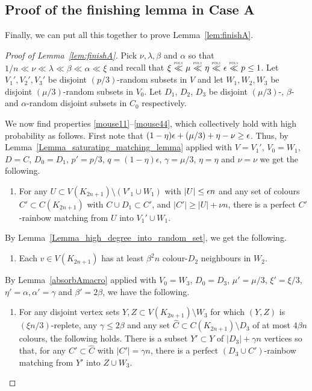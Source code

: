 \subsection{Proof of the finishing lemma in Case A}\label{sec:finishAfinal}
Finally, we can put all this together to prove Lemma~\ref{lem:finishA}.
\begin{proof}[Proof of Lemma~\ref{lem:finishA}]
Pick $\nu,\lambda,\beta$ and $\alpha$ so that $1/n\ll \nu \ll\lambda\ll\beta\ll \alpha\ll \xi$ and recall that $\xi \ll \mu\ll \eta\ll \eps\ll p\leq 1$. Let $V_1',V_2',V_3'$ be disjoint $(p/3)$-random subsets in $V$ and let $W_1,W_2,W_3$ be disjoint $(\mu/3)$-random subsets in $V_0$.
Let $D_1$, $D_2$, $D_3$ be disjoint $(\mu/3)$-, $\beta$- and $\alpha$-random disjoint subsets in $C_0$ respectively. 

We now find properties \ref{mouse11}--\ref{mouse44}, which collectively hold with high probability as follows.
First note that $(1-\eta)\epsilon+(\mu/3)+\eta-\nu \geq \epsilon$. Thus, by Lemma~\ref{Lemma_saturating_matching_lemma} applied with $V=V_1'$, $V_0=W_1$, $D=C$, $D_0=D_1$, $p'=p/3$, $q=(1-\eta)\epsilon$, $\gamma=\mu/3$, $\eta=\eta$ and $\nu=\nu$ we get the following.
\begin{enumerate}[label = {\bfseries \Alph{propcounter}\arabic{enumi}}]
\item For any $U\subset V(K_{2n+1})\setminus (V'_1\cup W_1)$ with $|U|\leq  \epsilon n$ and any set of colours $C'\subset C(K_{2n+1})$ with $C\cup D_1\subset C'$, and $|C'|  \geq |U|+\nu n$, there is a perfect $C'$-rainbow matching from $U$ into $V_1'\cup W_1$.\label{mouse11}
\end{enumerate}
By Lemma~\ref{Lemma_high_degree_into_random_set}, we get the following.
\begin{enumerate}[label = {\bfseries \Alph{propcounter}\arabic{enumi}}]\addtocounter{enumi}{1}
\item Each $v\in V(K_{2n+1})$ has at least $\beta^2 n$ colour-$D_2$ neighbours in $W_2$.\label{mouse2}
\end{enumerate}
By Lemma~\ref{absorbAmacro} applied with $V_0=W_3$,
$D_0=D_3$, $\mu'=\mu/3$, $\xi'=\xi/3$, $\eta'=\alpha, \alpha'=\gamma$ and $\beta'=2\beta$, we have the following.
\begin{enumerate}[label = {\bfseries \Alph{propcounter}\arabic{enumi}}]\addtocounter{enumi}{2}
\item For any disjoint vertex sets $Y,Z\subset V(K_{2n+1})\setminus W_3$ for which $(Y,Z)$ is $(\xi n/3)$-replete, any $\gamma\leq 2\beta$ and any set $\hat{C}\subset C(K_{2n+1})\setminus D_3$ of at most $4\beta n$ colours, the following holds. There is a subset $Y'\subset Y$ of $|D_3|+\gamma n$ vertices so that, for any $C'\subset \hat{C}$ with $|C'|=\gamma n$, there is a perfect $(D_3\cup C')$-rainbow matching from $Y'$ into $Z\cup W_3$.\label{mouse3}

\end{enumerate}
\end{proof}
